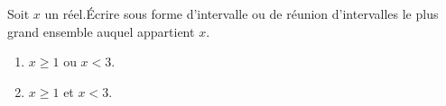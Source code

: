 
Soit $x$ un réel.Écrire sous forme d'intervalle ou de réunion d'intervalles le plus grand ensemble auquel appartient $x$.


\begin{enumerate}
	\item $x \geq 1$ ou $x<3$.  
	\item $x \geq 1$ et $x<3$.  
\end{enumerate}
